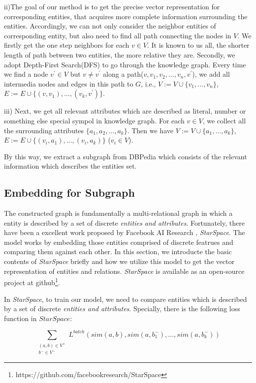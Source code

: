 ii)The goal of our method is to get the precise vector representation for corresponding entities,
that acquires more complete information surrounding the entities.
Accordingly, we can not only consider the neighbor entities of corresponding entity, but also
need to find all path connecting the nodes in $V$. 
We firstly get the one step neighbors for each $v \in V$. It is known to us all, the shorter
length of path between two entities, the more relative they are.
Secondly, we adopt Depth-First Search(DFS) to go through the knowledge graph. Every time we find a node
$v^{'} \in V$ but $v \ne v^{'}$ along a path($v, v_1, v_2,...,v_n, v^{'}$), we add all intermedia 
nodes and edges in this path to $G$, i.e., $V:=V \cup \{v_1, ..., v_n\}$, 
$E:=E \cup \{(v, v_1), ..., (v_k, v^{'})\}$.

iii) Next, we get all relevant attributes which are described as literal, number or something 
else special sympol in knowledge graph. For each $v \in V$, we collect all the surrounding attributes 
$\{a_1, a_2, ..., a_k\}$. Then we have $V:=V \cup \{a_1, ..., a_k\}$, 
$E:=E \cup \{(v_i, a_1), ..., (v_i, a_k)\}$ ($v_i \in V$).

By this way, we extract a subgraph from DBPedia which consists of the relevant information which describes
the entities set.

\subsection{Embedding for Subgraph}
\label{sec:train}
The constructed graph is fundamentally a multi-relational graph in which a entity is described by a set of discrete
\emph{entities and attributes}. Fortunately, there have been a excellent work proposed by Facebook AI Research
, \emph{StarSpace}. The model works by embedding those entities comprised of discrete featrues and
comparing them against each other. In this section, we introducte the basic contents of \emph{StarSpace} briefly and
how we utilize this model to get the vector representation of entities and relations. \emph{StarSpace} is available as
an open-source project at github\footnote{https://github.com/facebookresearch/StarSpace}.

In \emph{StarSpace}, to train our model, we need to compare entities which is described by a set of discrete
\emph{entities and attributes}. Specially, there is the following loss function in $StarSpace$:

\begin{small}
    \begin{equation}
        \nonumber
        \label{starspace_formula}
        \sum_{\substack{(a,b) \in V^+\\ b^- \in V^-}}L^{batch}(sim(a,b),sim(a,b_1^-),...,sim(a,b_k^-))
    \end{equation}
\end{small}

